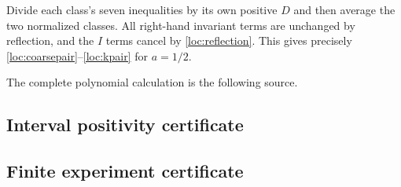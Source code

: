 Divide each class's seven inequalities by its own positive $D$ and
then average the two normalized classes.  All right-hand invariant
terms are unchanged by reflection, and the $I$ terms cancel by
\eqref{loc:reflection}.  This gives precisely
\eqref{loc:coarsepair}--\eqref{loc:kpair} for $a=1/2$.

The complete polynomial calculation is the following source.


\subsection{Interval positivity certificate}\label{cert:interval}


\subsection{Finite experiment certificate}\label{cert:grid}


